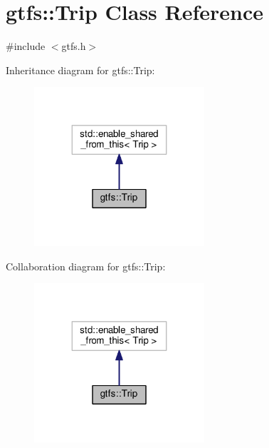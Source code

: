 \hypertarget{classgtfs_1_1Trip}{}\section{gtfs\+:\+:Trip Class Reference}
\label{classgtfs_1_1Trip}


{\ttfamily \#include $<$gtfs.\+h$>$}



Inheritance diagram for gtfs\+:\+:Trip\+:
\nopagebreak
\begin{figure}[H]
\begin{center}
\leavevmode
\includegraphics[width=179pt]{classgtfs_1_1Trip__inherit__graph}
\end{center}
\end{figure}


Collaboration diagram for gtfs\+:\+:Trip\+:
\nopagebreak
\begin{figure}[H]
\begin{center}
\leavevmode
\includegraphics[width=179pt]{classgtfs_1_1Trip__coll__graph}
\end{center}
\end{figure}
